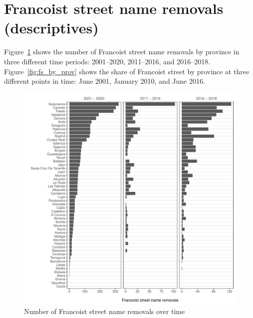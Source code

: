 \documentclass[12pt, titlepage]{article}
\begin{document}
\clearpage
\section{Francoist street name removals (descriptives)}

Figure~\ref{fig:changes_by_prov} shows the number of Francoist street name removals by province in three different time periods: 2001--2020, 2011--2016, and 2016--2018.
Figure~\ref{fig:fs_by_prov} shows the share of Francoist street by province at three different points in time: June 2001, January 2010, and June 2016.

\begin{figure}[htb!]
\centering

  \includegraphics[width = \textwidth]{img/changes_by_prov}

  \caption{Number of Francoist street name removals over time}\label{fig:changes_by_prov}

\end{figure}
\end{document}
